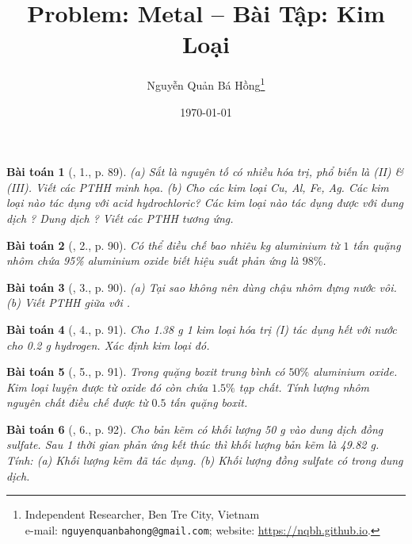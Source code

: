 \documentclass{article}
\title{Problem: Metal -- Bài Tập: Kim Loại}
\author{Nguyễn Quản Bá Hồng\footnote{Independent Researcher, Ben Tre City, Vietnam\\e-mail: \texttt{nguyenquanbahong@gmail.com}; website: \url{https://nqbh.github.io}.}}
\date{\today}
\newtheorem{baitoan}{Bài toán}
\begin{document}
\maketitle
\begin{abstract}
	
\end{abstract}
\setcounter{secnumdepth}{4}
\setcounter{tocdepth}{3}
\tableofcontents


\begin{baitoan}[\cite{An_Hoa_Hoc_nang_cao_8_9}, 1., p. 89]
	(a) Sắt là nguyên tố có nhiều hóa trị, phổ biến là (II) \& (III). Viết các {\rm PTHH} minh họa. (b) Cho các kim loại {\rm Cu, Al, Fe, Ag}. Các kim loại nào tác dụng với acid hydrochloric? Các kim loại nào tác dụng được với dung dịch {\rm{}}? Dung dịch {\rm{}}? Viết các {\rm PTHH} tương ứng.
\end{baitoan}

\begin{baitoan}[\cite{An_Hoa_Hoc_nang_cao_8_9}, 2., p. 90]
	Có thể điều chế bao nhiêu {\rm kg} aluminium từ $1$ tấn quặng nhôm chứa {\rm95\%} aluminium oxide biết hiệu suất phản ứng là $98\%$.
\end{baitoan}

\begin{baitoan}[\cite{An_Hoa_Hoc_nang_cao_8_9}, 3., p. 90]
	(a) Tại sao không nên dùng chậu nhôm đựng nước vôi. (b) Viết PTHH giữa {\rm{}} với {\rm{}}.
\end{baitoan}

\begin{baitoan}[\cite{An_Hoa_Hoc_nang_cao_8_9}, 4., p. 91]
	Cho {\rm1.38 g} 1 kim loại hóa trị (I) tác dụng hết với nước cho {\rm0.2 g} hydrogen. Xác định kim loại đó.
\end{baitoan}

\begin{baitoan}[\cite{An_Hoa_Hoc_nang_cao_8_9}, 5., p. 91]
	Trong quặng boxit trung bình có $50\%$ aluminium oxide. Kim loại luyện được từ oxide đó còn chứa $1.5\%$ tạp chất. Tính lượng nhôm nguyên chất điều chế được từ $0.5$ tấn quặng boxit.
\end{baitoan}

\begin{baitoan}[\cite{An_Hoa_Hoc_nang_cao_8_9}, 6., p. 92]
	Cho bản kẽm có khối lượng {\rm50 g} vào dung dịch đồng sulfate. Sau 1 thời gian phản ứng kết thúc thì khối lượng bản kẽm là {\rm49.82 g}. Tính: (a) Khối lượng kẽm đã tác dụng. (b) Khối lượng đồng sulfate có trong dung dịch.
\end{baitoan}
\end{document}

